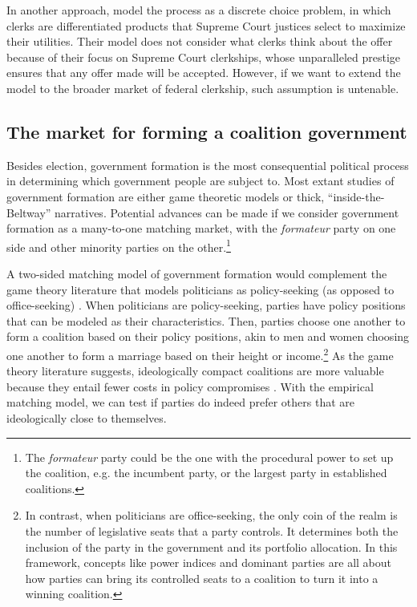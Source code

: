 In another approach, \citet{Rozema2016} model the process as a discrete choice
problem, in which clerks are differentiated products that Supreme Court justices
select to maximize their utilities. Their model does not consider what clerks
think about the offer because of their focus on Supreme Court clerkships, whose
unparalleled prestige ensures that any offer made will be accepted. However, if
we want to extend the model to the broader market of federal clerkship, such
assumption is untenable.

\subsection{The market for forming a coalition government}

Besides election, government formation is the most consequential political
process in determining which government people are subject to. Most extant
studies of government formation are either game theoretic models or thick,
``inside-the-Beltway'' narratives. Potential advances can be made if we consider
government formation as a many-to-one matching market, with the
\textit{formateur} party on one side and other minority parties on the
other.\footnote{The \textit{formateur} party could be the one with the
  procedural power to set up the coalition, e.g. the incumbent party, or the
  largest party in established coalitions.}

A two-sided matching model of government formation would complement the game
theory literature that models politicians as policy-seeking (as opposed to
office-seeking) \citep{Laver1998}. When politicians are policy-seeking, parties
have policy positions that can be modeled as their characteristics. Then,
parties choose one another to form a coalition based on their policy positions,
akin to men and women choosing one another to form a marriage based on their
height or income.\footnote{In contrast, when politicians are office-seeking, the
  only coin of the realm is the number of legislative seats that a party
  controls. It determines both the inclusion of the party in the government and
  its portfolio allocation. In this framework, concepts like power indices and
  dominant parties are all about how parties can bring its controlled seats to a
  coalition to turn it into a winning coalition.} As the game theory literature
suggests, ideologically compact coalitions are more valuable because they entail
fewer costs in policy compromises \citep{DeSwaan1973}. With the empirical
matching model, we can test if parties do indeed prefer others that are
ideologically close to themselves.

